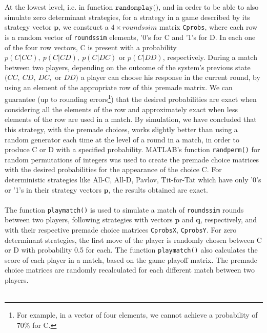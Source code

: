 \documentclass[12pt]{report}
\begin{document}
At the lowest level, i.e. in function $\texttt{randomplay()}$, and in order to be able to also simulate zero determinant strategies, for a strategy in a game described by its strategy vector $\mathbf{p}$, we construct a $4\times roundssim$ matrix \texttt{Cprobs}, where each row is a random vector of \texttt{roundssim} elements, '0's for C and '1's for D. In each one of the four row vectors, C is present with a probability $p(C|CC),\ p(C|CD),\ p(C|DC)$ or $p(C|DD)$, respectively. During a match between two players, depending on the outcome of the system's previous state $(CC,\ CD,\ DC,$ or $DD)$ a player can choose his response in the current round, by using an element  of the appropriate row of this premade matrix. We can guarantee (up to rounding errors\footnote{For example, in a vector of four elements, we cannot achieve a probability of $70\%$ for C.}) that the desired probabilities are exact when considering all the elements of the row and approximately exact when less elements of the row are used in a match. By simulation, we have concluded that this strategy, with the premade choices, works slightly better than using a random generator each time at the level of a round in a match, in order to produce C or D with a specified probability. MATLAB's function \texttt{randperm()} for random permutations of integers was used to create the premade choice matrices with the desired probabilities for the appearance of the choice C. For deterministic strategies like All-C, All-D, Pavlov, Tit-for-Tat which have only '0's or '1's in their strategy vectors $\mathbf{p}$, the results obtained are exact.
\\\\
The function \texttt{playmatch()} is used to simulate a match of \texttt{roundssim} rounds between two players, following strategies with vectors $\mathbf{p}$ and $\mathbf{q}$, respectively, and with their respective premade choice matrices \texttt{CprobsX}, \texttt{CprobsY}. For zero determinant strategies, the first move of the player is randomly chosen between C or D with probability 0.5 for each. The function \texttt{playmatch()} also calculates the score of each player in a match, based on the game playoff matrix. The premade choice matrices are randomly recalculated for each different match between two players.
\\\\
\end{document}

